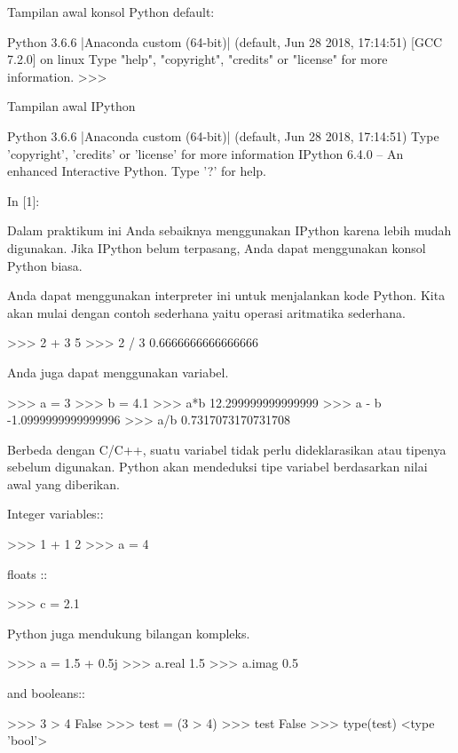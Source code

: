 \documentclass[a4paper,11pt]{extarticle}
\begin{document}
Tampilan awal konsol Python default:
\begin{textcode}
Python 3.6.6 |Anaconda custom (64-bit)| (default, Jun 28 2018, 17:14:51) 
[GCC 7.2.0] on linux
Type "help", "copyright", "credits" or "license" for more information.
>>>
\end{textcode}

Tampilan awal IPython
\begin{textcode}
Python 3.6.6 |Anaconda custom (64-bit)| (default, Jun 28 2018, 17:14:51) 
Type 'copyright', 'credits' or 'license' for more information
IPython 6.4.0 -- An enhanced Interactive Python. Type '?' for help.

In [1]:
\end{textcode}

Dalam praktikum ini Anda sebaiknya menggunakan IPython karena lebih
mudah digunakan. Jika IPython belum terpasang, Anda dapat menggunakan
konsol Python biasa.

Anda dapat menggunakan interpreter ini untuk menjalankan kode Python.
Kita akan mulai dengan contoh sederhana yaitu operasi aritmatika
sederhana.
\begin{pyconcode}
>>> 2 + 3
5
>>> 2 / 3
0.6666666666666666
\end{pyconcode}

Anda juga dapat menggunakan variabel.
\begin{pyconcode}
>>> a = 3
>>> b = 4.1
>>> a*b
12.299999999999999
>>> a - b
-1.0999999999999996
>>> a/b
0.7317073170731708
\end{pyconcode}

Berbeda dengan C/C++, suatu variabel tidak perlu dideklarasikan atau
tipenya sebelum digunakan. Python akan mendeduksi tipe variabel berdasarkan
nilai awal yang diberikan.

Integer variables::
\begin{pyconcode}
>>> 1 + 1
2
>>> a = 4
\end{pyconcode}

floats ::
\begin{pyconcode}
>>> c = 2.1
\end{pyconcode}

Python juga mendukung bilangan kompleks.
\begin{pyconcode}
>>> a = 1.5 + 0.5j
>>> a.real
1.5
>>> a.imag
0.5
\end{pyconcode}

and booleans::
\begin{pyconcode}
>>> 3 > 4
False
>>> test = (3 > 4)
>>> test
False
>>> type(test)
<type 'bool'>
\end{pyconcode}
\end{document}

